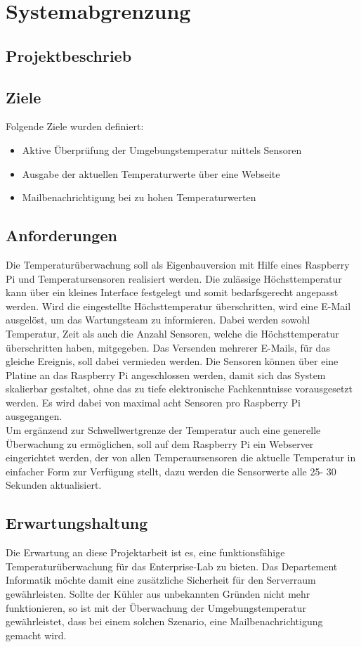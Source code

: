 \section{Systemabgrenzung}
\subsection{Projektbeschrieb}
\subsection{Ziele}
Folgende Ziele wurden definiert:
\begin{itemize}
\item Aktive Überprüfung der Umgebungstemperatur mittels Sensoren
\item Ausgabe der aktuellen Temperaturwerte über eine Webseite
\item Mailbenachrichtigung bei zu hohen Temperaturwerten
\end{itemize}

\subsection{Anforderungen}
Die Temperaturüberwachung soll als Eigenbauversion mit Hilfe eines Raspberry Pi und Temperatursensoren realisiert werden. Die zulässige Höchsttemperatur kann über ein kleines Interface festgelegt und somit bedarfsgerecht angepasst werden. Wird die eingestellte Höchsttemperatur überschritten, wird eine E-Mail ausgelöst, um das Wartungsteam zu informieren. Dabei werden sowohl Temperatur, Zeit als auch die Anzahl Sensoren, welche die Höchsttemperatur überschritten haben, mitgegeben. Das Versenden mehrerer E-Mails, für das gleiche Ereignis, soll dabei vermieden werden. Die Sensoren können über eine Platine an das Raspberry Pi angeschlossen werden, damit sich das System skalierbar gestaltet, ohne das zu tiefe elektronische Fachkenntnisse vorausgesetzt werden. Es wird dabei von maximal acht Sensoren pro Raspberry Pi ausgegangen.\\
Um ergänzend zur Schwellwertgrenze der Temperatur auch eine generelle Überwachung zu ermöglichen, soll auf dem Raspberry Pi ein Webserver eingerichtet werden, der von allen Temperaursensoren die aktuelle Temperatur in einfacher Form zur Verfügung stellt, dazu werden die Sensorwerte alle 25- 30 Sekunden aktualisiert.
\subsection{Erwartungshaltung}
Die Erwartung an diese Projektarbeit ist es, eine funktionsfähige  Temperaturüberwachung für das Enterprise-Lab zu bieten. Das Departement Informatik möchte damit eine zusätzliche Sicherheit für den Serverraum gewährleisten. Sollte der Kühler aus unbekannten Gründen nicht mehr funktionieren, so ist mit der Überwachung der Umgebungstemperatur gewährleistet, dass bei einem solchen Szenario, eine Mailbenachrichtigung gemacht wird.
